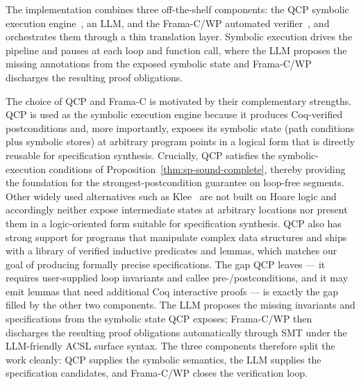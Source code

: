 
The implementation combines three off-the-shelf components: the QCP symbolic execution engine~\cite{wu2025qcppracticalseparationlogicbased,vst-a}, an LLM, and the Frama-C/WP automated verifier~\cite{cuoq2012frama}, and orchestrates them through a thin translation layer. Symbolic execution drives the pipeline and pauses at each loop and function call, where the LLM proposes the missing annotations from the exposed symbolic state and Frama-C/WP discharges the resulting proof obligations.


The choice of QCP and Frama-C is motivated by their complementary strengths. QCP is used as the symbolic execution engine because it produces Coq-verified postconditions and, more importantly, exposes its symbolic state (path conditions plus symbolic stores) at arbitrary program points in a logical form that is directly reusable for specification synthesis. Crucially, QCP satisfies the symbolic-execution conditions of Proposition~\ref{thm:sp-sound-complete}, thereby providing the foundation for the strongest-postcondition guarantee on loop-free segments. Other widely used alternatives such as Klee~\cite{DBLP:conf/osdi/CadarDE08} are not built on Hoare logic and accordingly neither expose intermediate states at arbitrary locations nor present them in a logic-oriented form suitable for specification synthesis. QCP also has strong support for programs that manipulate complex data structures and ships with a library of verified inductive predicates and lemmas, which matches our goal of producing formally precise specifications. The gap QCP leaves --- it requires user-supplied loop invariants and callee pre-/postconditions, and it may emit lemmas that need additional Coq interactive proofs --- is exactly the gap filled by the other two components. The LLM proposes the missing invariants and specifications from the symbolic state QCP exposes; Frama-C/WP then discharges the resulting proof obligations automatically through SMT under the LLM-friendly ACSL surface syntax. The three components therefore split the work cleanly: QCP supplies the symbolic semantics, the LLM supplies the specification candidates, and Frama-C/WP closes the verification loop.

